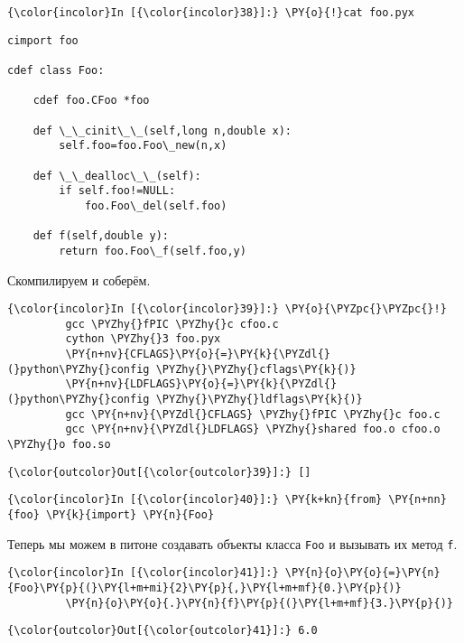     \begin{Verbatim}[commandchars=\\\{\}]
{\color{incolor}In [{\color{incolor}38}]:} \PY{o}{!}cat foo.pyx
\end{Verbatim}

    \begin{Verbatim}[commandchars=\\\{\}]
cimport foo

cdef class Foo:

    cdef foo.CFoo *foo

    def \_\_cinit\_\_(self,long n,double x):
        self.foo=foo.Foo\_new(n,x)

    def \_\_dealloc\_\_(self):
        if self.foo!=NULL:
            foo.Foo\_del(self.foo)

    def f(self,double y):
        return foo.Foo\_f(self.foo,y)

    \end{Verbatim}

    Скомпилируем и соберём.

    \begin{Verbatim}[commandchars=\\\{\}]
{\color{incolor}In [{\color{incolor}39}]:} \PY{o}{\PYZpc{}\PYZpc{}!}
         gcc \PYZhy{}fPIC \PYZhy{}c cfoo.c
         cython \PYZhy{}3 foo.pyx
         \PY{n+nv}{CFLAGS}\PY{o}{=}\PY{k}{\PYZdl{}(}python\PYZhy{}config \PYZhy{}\PYZhy{}cflags\PY{k}{)}
         \PY{n+nv}{LDFLAGS}\PY{o}{=}\PY{k}{\PYZdl{}(}python\PYZhy{}config \PYZhy{}\PYZhy{}ldflags\PY{k}{)}
         gcc \PY{n+nv}{\PYZdl{}CFLAGS} \PYZhy{}fPIC \PYZhy{}c foo.c
         gcc \PY{n+nv}{\PYZdl{}LDFLAGS} \PYZhy{}shared foo.o cfoo.o \PYZhy{}o foo.so
\end{Verbatim}

            \begin{Verbatim}[commandchars=\\\{\}]
{\color{outcolor}Out[{\color{outcolor}39}]:} []
\end{Verbatim}
        
    \begin{Verbatim}[commandchars=\\\{\}]
{\color{incolor}In [{\color{incolor}40}]:} \PY{k+kn}{from} \PY{n+nn}{foo} \PY{k}{import} \PY{n}{Foo}
\end{Verbatim}

    Теперь мы можем в питоне создавать объекты класса \texttt{Foo} и
вызывать их метод \texttt{f}.

    \begin{Verbatim}[commandchars=\\\{\}]
{\color{incolor}In [{\color{incolor}41}]:} \PY{n}{o}\PY{o}{=}\PY{n}{Foo}\PY{p}{(}\PY{l+m+mi}{2}\PY{p}{,}\PY{l+m+mf}{0.}\PY{p}{)}
         \PY{n}{o}\PY{o}{.}\PY{n}{f}\PY{p}{(}\PY{l+m+mf}{3.}\PY{p}{)}
\end{Verbatim}

            \begin{Verbatim}[commandchars=\\\{\}]
{\color{outcolor}Out[{\color{outcolor}41}]:} 6.0
\end{Verbatim}
